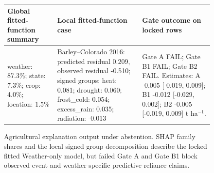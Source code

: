 \begin{figure}[t]
\centering
\scriptsize
\setlength{\tabcolsep}{3.5pt}
\renewcommand{\arraystretch}{1.08}
\begin{tabular}{p{}p{}p{}}
\toprule
Global fitted-function summary & Local fitted-function case & Gate outcome on locked rows \\
\midrule
weather: 87.3\%; state: 7.3\%; crop: 4.0\%; location: 1.5\% & Barley--Colorado 2016: predicted residual 0.209, observed residual -0.510; signed groups: heat: 0.081; drought: 0.060; frost\_cold: 0.054; excess\_rain: 0.035; radiation: -0.013 & Gate A FAIL; Gate B1 FAIL; Gate B2 FAIL. Estimates: A -0.005 [-0.019, 0.009]; B1 -0.012 [-0.029, 0.002]; B2 -0.005 [-0.019, 0.009] t ha$^{-1}$. \\
\bottomrule
\end{tabular}
\caption{Agricultural explanation output under abstention. SHAP family shares and the local signed group decomposition describe the locked fitted Weather-only model, but failed Gate A and Gate B1 block observed-event and weather-specific predictive-reliance claims.}
\label{fig:xaiabstention}
\end{figure}
